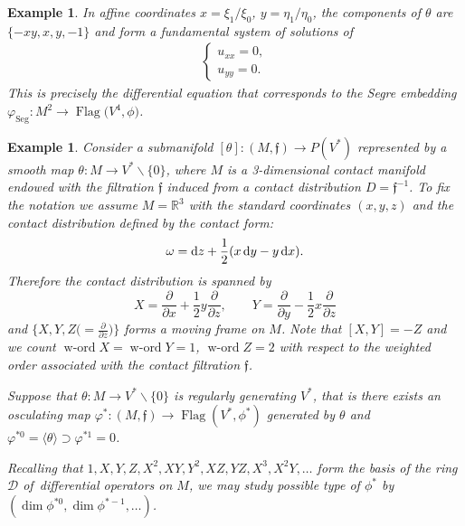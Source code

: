 \documentclass[10pt,a4paper]{amsart}
\newcommand{\R}{\mathbb R}
\newcommand{\cD}{\mathcal D}
\newcommand{\f}{\mathfrak f}
\newcommand{\Flag}{\operatorname{Flag}}
\newcommand{\word}{\operatorname{w-ord}}
\newtheorem{ex}[thm]{Example}
\numberwithin{equation}{section}
\begin{document}
\begin{ex}
In affine coordinates $x=\xi_1/\xi_0$, $y=\eta_1/\eta_0$, the components of $\theta$ are $\{-xy, x, y, -1\}$ and form a fundamental system of solutions of
\begin{gather*}
\begin{cases}
u_{xx}=0, \\
u_{yy}=0.
\end{cases}
\end{gather*}
This is precisely the differential equation that corresponds to the Segre embedding $\varphi_{\text{Seg}}\colon M^2\to \Flag\big(V^4,\phi\big)$.
\end{ex}

\begin{ex}\label{ex:A2}
	Consider a submanifold $[\theta]\colon (M,\f)\to P(V^*)$ represented by a smooth map $\theta\colon M\to V^*\backslash\{0\}$, where $M$ is a 3-dimensional contact manifold endowed with the filtration $\f$ induced from a contact distribution $D=\f^{-1}$. To fix the notation we assume $M=\R^3$ with the standard coordinates $(x,y,z)$ and the contact distribution defined by the contact form:
	\[
	\omega = {\rm d}z+\frac{1}{2}(x\,{\rm d}y-y\,{\rm d}x).
	\]
	Therefore the contact distribution is spanned by
	\[
	X = \frac{\partial}{\partial x} + \frac{1}{2}y\frac{\partial}{\partial z},\qquad
	Y = \frac{\partial}{\partial y} - \frac{1}{2}x\frac{\partial}{\partial z}
	\]
	and $\big\{X,Y,Z\big({=}\frac{\partial}{\partial z}\big)\big\}$ forms a moving frame on $M$. Note that $[X,Y]=-Z$ and we count $\word X=\word Y = 1$, $\word Z=2$ with respect to the weighted order associated with the contact filtration $\f$.
	
	Suppose that $\theta\colon M\to V^*\backslash\{0\}$ is regularly generating $V^*$, that is there exists an osculating map $\varphi^*\colon (M,\f)\to \Flag(V^*,\phi^*)$ generated by $\theta$ and $\varphi^{*0}=\langle \theta\rangle \supset \varphi^{*1}=0$.
	
	Recalling that $1,X,Y,Z,X^2,XY,Y^2,XZ,YZ,X^3,X^2Y,\dots$ form the basis of the ring $\cD$ of~dif\-ferential operators on $M$, we may study possible type of $\phi^*$ by $\left(\dim \phi^{*0}, \dim \phi^{*-1},\dots\right)$.
	

\end{ex}
\end{document}
